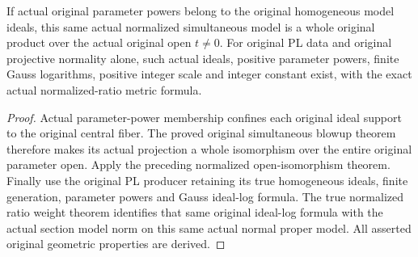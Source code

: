 \begin{theorem}
\label{thm:actual-normalized-pl-model-noncentral-product}
\leanok
{}
If actual original parameter powers belong to the original homogeneous model
ideals, this same actual normalized simultaneous model is a whole original
product over the actual original open $t\ne0$. For original PL data and
original projective normality alone, such actual ideals, positive parameter
powers, finite Gauss logarithms, positive integer scale and integer constant
exist, with the exact actual normalized-ratio metric formula.
\end{theorem}
\begin{proof}
Actual parameter-power membership confines each original ideal support to
the original central fiber. The proved original simultaneous blowup theorem
therefore makes its actual projection a whole isomorphism over the entire
original parameter open. Apply the preceding normalized open-isomorphism
theorem. Finally use the original PL producer retaining its true homogeneous
ideals, finite generation, parameter powers and Gauss ideal-log formula.
The true normalized ratio weight theorem identifies that same original
ideal-log formula with the actual section model norm on this same actual
normal proper model. All asserted original geometric properties are derived.
\end{proof}
